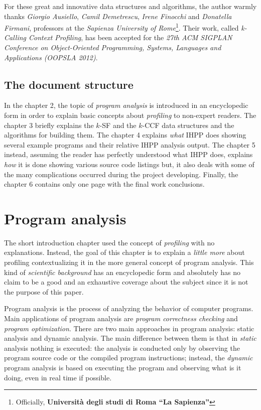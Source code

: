 \documentclass[a4paper,10pt]{report}
\begin{document}
For these great and innovative data structures and algorithms, the author warmly
thanks \emph{Giorgio Ausiello}, \emph{Camil Demetrescu}, \emph{Irene Finocchi}
and \emph{Donatella Firmani}, professors at the \emph{Sapienza University of
Rome}\footnote{Officially, \textbf{Universit\`a degli studi di Roma ``La
Sapienza''}}.
Their work, called \emph{\mbox{k-Calling} \mbox{Context} \mbox{Profiling}}, has
been accepted for the \emph{27th \mbox{ACM} \mbox{SIGPLAN} Conference on
Object-Oriented Programming, Systems, Languages and Applications (OOPSLA 2012)}.

\section{The document structure}
In the chapter 2, the topic of \emph{program analysis} is
introduced in an encyclopedic form in order to explain
basic concepts about \emph{profiling} to non-expert readers. 
The chapter 3 briefly explains the $k$-SF and the $k$-CCF data structures
and the algorithms for building them. The chapter 4 explains \emph{what} 
IHPP does showing several example programs and their relative IHPP analysis 
output. The chapter 5 instead, assuming the reader has perfectly understood 
what IHPP does, explains \emph{how} it is done showing various
source code listings but, it also deals with some of the many complications occurred
during the project developing. Finally, the chapter 6 contains only one
page with the final work conclusions.

\chapter{Program analysis}
The short introduction chapter used the concept of \emph{profiling} with 
no explanations. Instead, the goal of this chapter is to explain a \emph{little more} about
profiling contextualizing it in the more general concept of program analysis.
This kind of \emph{scientific background} has an encyclopedic form and
absolutely has no claim to be a good and an exhaustive coverage about the
subject since it is not the purpose of this paper.

Program analysis is the process of analyzing the behavior of computer
programs. Main applications of program analysis are 
\emph{program correctness checking} and \emph{program optimization}.
There are two main approaches in program analysis: static analysis and dynamic analysis.
The main difference between them is that in \emph{static} analysis nothing is
executed: the analysis is conducted only by observing the program source code or
the compiled program instructions; instead, the \emph{dynamic} program analysis
is based on executing the program and observing what is it doing, even in real
time if possible.
\end{document}
